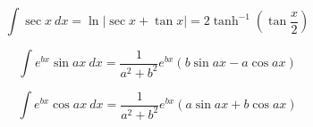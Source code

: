     \begin{equation}
    \int \sec x \ dx = \ln | \sec x + \tan x | = 2 \tanh^{-1} \left (\tan \frac{x}{2} \right) 
    \end{equation}
    
\begin{equation}\label{eq:ritzert}
    \int e^{bx} \sin ax\ dx = \frac{1}{a^2+b^2}e^{bx} (b\sin ax - a\cos ax) 
    \end{equation}


\begin{equation}
    \int e^{bx} \cos ax\ dx = \frac{1}{a^2 + b^2} e^{bx} ( a \sin ax + b \cos ax ) 
    \end{equation}